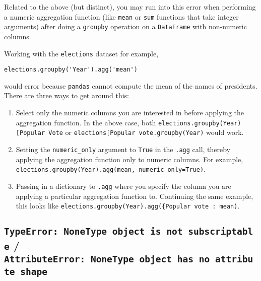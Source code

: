\documentclass[
  letterpaper,
  DIV=11,
  numbers=noendperiod]{scrreprt}
\providecommand{\tightlist}{%
  \setlength{\itemsep}{0pt}\setlength{\parskip}{0pt}}\usepackage{longtable,booktabs,array}
\begin{document}
Related to the above (but distinct), you may run into this error when
performing a numeric aggregation function (like \texttt{mean} or
\texttt{sum} functions that take integer arguments) after doing a
\texttt{groupby} operation on a \texttt{DataFrame} with non-numeric
columns.

Working with the \texttt{elections} dataset for example,

\begin{verbatim}
elections.groupby('Year').agg('mean')
\end{verbatim}

would error because \texttt{pandas} cannot compute the mean of the names
of presidents. There are three ways to get around this:

\begin{enumerate}
\def\labelenumi{\arabic{enumi}.}
\tightlist
\item
  Select only the numeric columns you are interested in before applying
  the aggregation function. In the above case, both
  \texttt{elections.groupby(\textquotesingle{}Year\textquotesingle{}){[}\textquotesingle{}Popular\ Vote\textquotesingle{}{]}}
  or
  \texttt{elections{[}\textquotesingle{}Popular\ vote\textquotesingle{}{]}.groupby(\textquotesingle{}Year\textquotesingle{})}
  would work.
\item
  Setting the \texttt{numeric\_only} argument to \texttt{True} in the
  \texttt{.agg} call, thereby applying the aggregation function only to
  numeric columns. For example,
  \texttt{elections.groupby(\textquotesingle{}Year\textquotesingle{}).agg(\textquotesingle{}mean\textquotesingle{},\ numeric\_only=True)}.
\item
  Passing in a dictionary to \texttt{.agg} where you specify the column
  you are applying a particular aggregation function to. Continuing the
  same example, this looks like
  \texttt{elections.groupby(\textquotesingle{}Year\textquotesingle{}).agg(\{\textquotesingle{}Popular\ vote\textquotesingle{}\ :\ \textquotesingle{}mean\textquotesingle{})}.
\end{enumerate}

\subsection{\texorpdfstring{\texttt{TypeError:\ \textquotesingle{}NoneType\textquotesingle{}\ object\ is\ not\ subscriptable}
/
\texttt{AttributeError:\ \textquotesingle{}NoneType\textquotesingle{}\ object\ has\ no\ attribute\ \textquotesingle{}shape\textquotesingle{}}}{TypeError: \textquotesingle NoneType\textquotesingle{} object is not subscriptable / AttributeError: \textquotesingle NoneType\textquotesingle{} object has no attribute \textquotesingle shape\textquotesingle{}}}\label{typeerror-nonetype-object-is-not-subscriptable-attributeerror-nonetype-object-has-no-attribute-shape}
\end{document}
